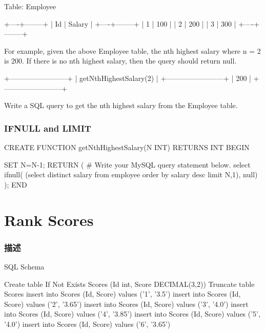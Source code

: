 Table: Employee
\begin{Code}
+----+--------+
| Id | Salary |
+----+--------+
| 1  | 100    |
| 2  | 200    |
| 3  | 300    |
+----+--------+
\end{Code}

For example, given the above Employee table, the nth highest salary where n = 2 is 200. If there is no nth highest salary, then the query should return null.
\begin{Code}
+------------------------+
| getNthHighestSalary(2) |
+------------------------+
| 200                    |
+------------------------+
\end{Code}

Write a SQL query to get the nth highest salary from the Employee table.

\subsubsection{IFNULL and LIMIT}
\begin{Code}
CREATE FUNCTION getNthHighestSalary(N INT) RETURNS INT
BEGIN

SET N=N-1;
  RETURN (
      # Write your MySQL query statement below.
      select
          ifnull(
              (select distinct
                   salary
               from
                   employee
               order by  salary desc
               limit N,1),
          null)
  );
END
\end{Code}

\section{Rank Scores} %
\label{sec:rank-scores}


\subsubsection{描述}
SQL Schema

\begin{Code}
Create table If Not Exists Scores (Id int, Score DECIMAL(3,2))
Truncate table Scores
insert into Scores (Id, Score) values ('1', '3.5')
insert into Scores (Id, Score) values ('2', '3.65')
insert into Scores (Id, Score) values ('3', '4.0')
insert into Scores (Id, Score) values ('4', '3.85')
insert into Scores (Id, Score) values ('5', '4.0')
insert into Scores (Id, Score) values ('6', '3.65')
\end{Code}

